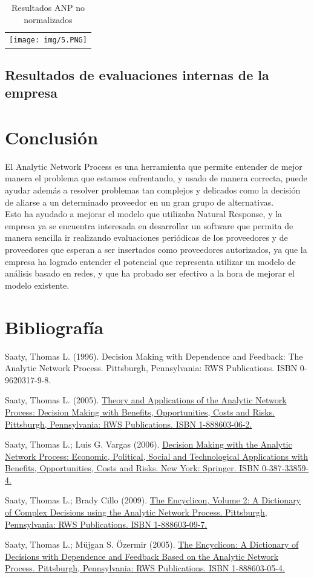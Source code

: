 \documentclass[12pt,letterpaper]{article}
\begin{document}
\begin{table}[h]
\centering
\begin{tabular}{c}
\texttt{[image: img/5.PNG]}
\end{tabular}
\caption{Resultados ANP no normalizados}
\label{tab:ANP no normalizado}
\end{table}

\newpage
\subsection{Resultados de evaluaciones internas de la empresa}

\newpage
\section{Conclusión}
El Analytic Network Process es una herramienta que permite entender de mejor manera el problema que estamos enfrentando, y usado de manera correcta, puede ayudar además a resolver problemas tan complejos y delicados como la decisión de aliarse a un determinado proveedor en un gran grupo de alternativas.\\
Esto ha ayudado a mejorar el modelo que utilizaba Natural Response, y la empresa ya se encuentra interesada en desarrollar un software que permita de manera sencilla ir realizando evaluaciones periódicas de los proveedores y de proveedores que esperan a ser insertados como proveedores autorizados, ya que la empresa ha logrado entender el potencial que representa utilizar un modelo de análisis basado en redes, y que ha probado ser efectivo a la hora de mejorar el modelo existente.
\newpage
\section{Bibliografía}
\itemize
\item Saaty, Thomas L. (1996). Decision Making with Dependence and Feedback: The Analytic Network Process. Pittsburgh, Pennsylvania: RWS Publications. ISBN 0-9620317-9-8.
\item Saaty, Thomas L. (2005). \href{http://www.amazon.com/dp/1888603062}{Theory and Applications of the Analytic Network Process: Decision Making with Benefits, Opportunities, Costs and Risks. Pittsburgh, Pennsylvania: RWS Publications. ISBN 1-888603-06-2.}
\item Saaty, Thomas L.; Luis G. Vargas (2006). \href{http://www.amazon.com/dp/0387338594}{Decision Making with the Analytic Network Process: Economic, Political, Social and Technological Applications with Benefits, Opportunities, Costs and Risks. New York: Springer. ISBN 0-387-33859-4.}
\item Saaty, Thomas L.; Brady Cillo (2009). \href{http://rwspublications.com/}{The Encyclicon, Volume 2: A Dictionary of Complex Decisions using the Analytic Network Process. Pittsburgh, Pennsylvania: RWS Publications. ISBN 1-888603-09-7.}
\item Saaty, Thomas L.; Müjgan S. Özermir (2005). \href{http://www.amazon.com/dp/1888603054}{The Encyclicon: A Dictionary of Decisions with Dependence and Feedback Based on the Analytic Network Process. Pittsburgh, Pennsylvania: RWS Publications. ISBN 1-888603-05-4.}
\end{document}
